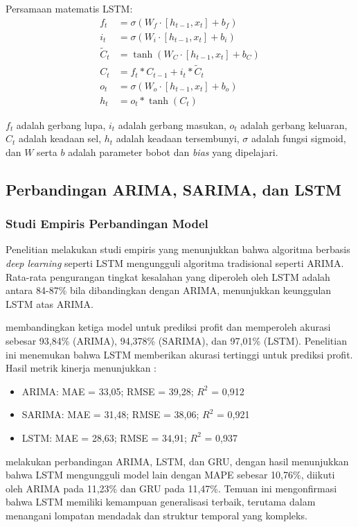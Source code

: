Persamaan matematis LSTM:
\begin{align}
f_t &= \sigma(W_f \cdot [h_{t-1}, x_t] + b_f) \\
i_t &= \sigma(W_i \cdot [h_{t-1}, x_t] + b_i) \\
\tilde{C}_t &= \tanh(W_C \cdot [h_{t-1}, x_t] + b_C) \\
C_t &= f_t * C_{t-1} + i_t * \tilde{C}_t \\
o_t &= \sigma(W_o \cdot [h_{t-1}, x_t] + b_o) \\
h_t &= o_t * \tanh(C_t)
\end{align}

$f_t$ adalah gerbang lupa, $i_t$ adalah gerbang masukan, $o_t$ adalah gerbang keluaran, $C_t$ adalah keadaan sel, $h_t$ adalah keadaan tersembunyi, $\sigma$ adalah fungsi sigmoid, dan $W$ serta $b$ adalah parameter bobot dan \textit{bias} yang dipelajari.

\subsection{Perbandingan ARIMA, SARIMA, dan LSTM}

\subsubsection{Studi Empiris Perbandingan Model}

Penelitian \textcite{siami2018comparison} melakukan studi empiris yang menunjukkan bahwa algoritma berbasis \textit{deep learning} seperti LSTM mengungguli algoritma tradisional seperti ARIMA. Rata-rata pengurangan tingkat kesalahan yang diperoleh oleh LSTM adalah antara 84-87\% bila dibandingkan dengan ARIMA, menunjukkan keunggulan LSTM atas ARIMA.

\textcite{sirisha2022profit} membandingkan ketiga model untuk prediksi profit dan memperoleh akurasi sebesar 93,84\% (ARIMA), 94,378\% (SARIMA), dan 97,01\% (LSTM). Penelitian ini menemukan bahwa LSTM memberikan akurasi tertinggi untuk prediksi profit. Hasil metrik kinerja menunjukkan \parencite{sirisha2022profit}:
\begin{itemize}
\item ARIMA: MAE = 33,05; RMSE = 39,28; $R^2$ = 0,912
\item SARIMA: MAE = 31,48; RMSE = 38,06; $R^2$ = 0,921
\item LSTM: MAE = 28,63; RMSE = 34,91; $R^2$ = 0,937
\end{itemize}

\textcite{sunendar2025comparison} melakukan perbandingan ARIMA, LSTM, dan GRU, dengan hasil menunjukkan bahwa LSTM mengungguli model lain dengan MAPE sebesar 10,76\%, diikuti oleh ARIMA pada 11,23\% dan GRU pada 11,47\%. Temuan ini mengonfirmasi bahwa LSTM memiliki kemampuan generalisasi terbaik, terutama dalam menangani lompatan mendadak dan struktur temporal yang kompleks.

